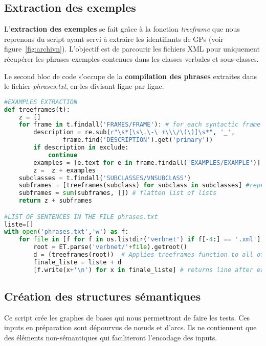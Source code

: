 \subsection{Extraction des exemples}

L'\textbf{extraction des exemples} se fait grâce à la fonction \emph{treeframe} que nous reprenons du script ayant servi à extraire les identifiants de \acp{GP} (voir figure~\ref{fig:archivn}). L'objectif est de parcourir les fichiers XML pour uniquement récupérer les phrases exemples contenues dans les classes verbales et sous-classes.

Le second bloc de code s'occupe de la \textbf{compilation des phrases} extraites dans le fichier \emph{phrases.txt}, en les divisant ligne par ligne. 

\begin{lstlisting}[language=Python, caption = Extraction des phrases exemples de VerbNet]
#EXAMPLES EXTRACTION
def treeframes(t):
    z = []
    for frame in t.findall('FRAMES/FRAME'): # for each syntactic frame
        description = re.sub(r"\s*[\s\.\-\ +\\\/\(\)]\s*", '_',
				frame.find('DESCRIPTION').get('primary'))
        if description in exclude:
            continue    
        examples = [e.text for e in frame.findall('EXAMPLES/EXAMPLE')] # get the examples
        z =  z + examples 
    subclasses = t.findall('SUBCLASSES/VNSUBCLASS')
    subframes = [treeframes(subclass) for subclass in subclasses] #repeat operation for subclasses
    subframes = sum(subframes, []) # flatten list of lists
    return z + subframes

#LIST OF SENTENCES IN THE FILE phrases.txt
liste=[]
with open('phrases.txt','w') as f:
    for file in [f for f in os.listdir('verbnet') if f[-4:] == '.xml']:
        root = ET.parse('verbnet/'+file).getroot()       
        d = (treeframes(root))  # Applies treeframes function to all of VerbNet files
        finale_liste = liste + d
        [f.write(x+'\n') for x in finale_liste] # returns line after each example

\end{lstlisting}

\subsection{Création des structures sémantiques}\label{sec:pythonstruc}

Ce script crée les graphes de bases qui nous permettront de faire les tests. Ces inputs en préparation sont dépourvus de n\oe{}uds et d'arcs. Ils ne contiennent que des éléments non-sémantiques qui faciliteront l'encodage des inputs.

